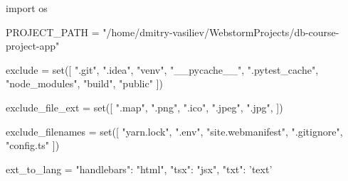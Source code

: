 \begin{pycode}
import os

PROJECT_PATH = "/home/dmitry-vasiliev/WebstormProjects/db-course-project-app"

exclude = set([
    ".git",
    ".idea",
    "venv",
    "__pycache__",
    ".pytest_cache",
    "node_modules",
    "build",
    "public"
])

exclude_file_ext = set([
    ".map",
    ".png",
    ".ico",
    ".jpeg",
    ".jpg",
])

exclude_filenames = set([
    "yarn.lock",
    ".env",
    "site.webmanifest",
    ".gitignore",
    "config.ts"
])

ext_to_lang = {
    "handlebars": "html",
    "tsx": "jsx",
    "txt": 'text'
}
\end{pycode}